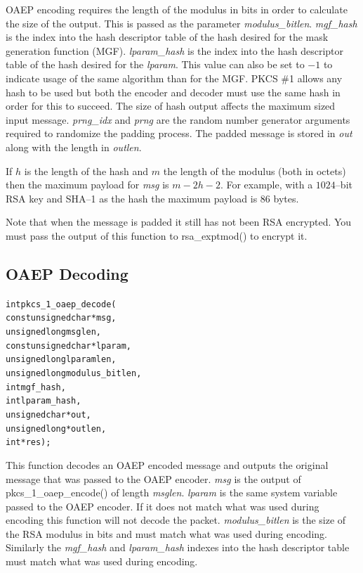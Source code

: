 \documentclass[synpaper]{book}
\begin{document}
OAEP encoding requires the length of the modulus in bits in order to calculate the size of the output.  This is passed as the parameter
\textit{modulus\_bitlen}.  \textit{mgf\_hash} is the index into the hash descriptor table of the hash desired for the mask generation function (MGF).
\textit{lparam\_hash} is the index into the hash descriptor table of the hash desired for the \textit{lparam}.  This value can also be set to $-1$
to indicate usage of the same algorithm than for the MGF.  PKCS \#1 allows any hash to be
used but both the encoder and decoder must use the same hash in order for this to succeed.  The size of hash output affects the maximum
 sized input message.  \textit{prng\_idx} and \textit{prng} are the random number generator arguments required to randomize the padding process.
The padded message is stored in \textit{out} along with the length in \textit{outlen}.

If $h$ is the length of the hash and $m$ the length of the modulus (both in octets) then the maximum payload for \textit{msg} is
$m - 2h - 2$.  For example, with a $1024$--bit RSA key and SHA--1 as the hash the maximum payload is $86$ bytes.

Note that when the message is padded it still has not been RSA encrypted.  You must pass the output of this function to
rsa\_exptmod() to encrypt it.

\subsection{OAEP Decoding}

\begin{alltt}
int pkcs_1_oaep_decode(
    const unsigned char *msg,
          unsigned long  msglen,
    const unsigned char *lparam,
          unsigned long  lparamlen,
          unsigned long  modulus_bitlen,
                    int  mgf_hash,
                    int  lparam_hash,
          unsigned char *out,
          unsigned long *outlen,
                    int *res);
\end{alltt}

This function decodes an OAEP encoded message and outputs the original message that was passed to the OAEP encoder.  \textit{msg} is the
output of pkcs\_1\_oaep\_encode() of length \textit{msglen}.  \textit{lparam} is the same system variable passed to the OAEP encoder.  If it does not
match what was used during encoding this function will not decode the packet.  \textit{modulus\_bitlen} is the size of the RSA modulus in bits
and must match what was used during encoding.  Similarly the \textit{mgf\_hash} and \textit{lparam\_hash} indexes into the hash descriptor table must
match what was used during encoding.
\end{document}
